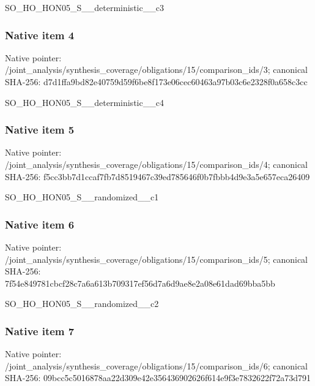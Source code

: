 \documentclass[10pt,a4paper]{article}
\begin{document}
\begingroup\raggedright\sloppy SO\_\allowbreak{}HO\_\allowbreak{}HON05\_\allowbreak{}S\_\allowbreak{}\_\allowbreak{}deterministic\_\allowbreak{}\_\allowbreak{}c3\par\endgroup

\subsubsection{Native item 4}
Native pointer: /joint\_\allowbreak{}analysis/synthesis\_\allowbreak{}coverage/obligations/15/comparison\_\allowbreak{}ids/3; canonical SHA-256: d7d1ffa9bd82e40759d59f6be8f173e06cec60463a97b03c6e2328f0a658c3cc

\begingroup\raggedright\sloppy SO\_\allowbreak{}HO\_\allowbreak{}HON05\_\allowbreak{}S\_\allowbreak{}\_\allowbreak{}deterministic\_\allowbreak{}\_\allowbreak{}c4\par\endgroup

\subsubsection{Native item 5}
Native pointer: /joint\_\allowbreak{}analysis/synthesis\_\allowbreak{}coverage/obligations/15/comparison\_\allowbreak{}ids/4; canonical SHA-256: f5cc3bb7d1ccaf7fb7d8519467c39ed785646f0b7fbbb4d9e3a5e657eca26409

\begingroup\raggedright\sloppy SO\_\allowbreak{}HO\_\allowbreak{}HON05\_\allowbreak{}S\_\allowbreak{}\_\allowbreak{}randomized\_\allowbreak{}\_\allowbreak{}c1\par\endgroup

\subsubsection{Native item 6}
Native pointer: /joint\_\allowbreak{}analysis/synthesis\_\allowbreak{}coverage/obligations/15/comparison\_\allowbreak{}ids/5; canonical SHA-256: 7f54e849781cbcf28c7a6a613b709317ef56d7a6d9ae8e2a08e61dad69bba5bb

\begingroup\raggedright\sloppy SO\_\allowbreak{}HO\_\allowbreak{}HON05\_\allowbreak{}S\_\allowbreak{}\_\allowbreak{}randomized\_\allowbreak{}\_\allowbreak{}c2\par\endgroup

\subsubsection{Native item 7}
Native pointer: /joint\_\allowbreak{}analysis/synthesis\_\allowbreak{}coverage/obligations/15/comparison\_\allowbreak{}ids/6; canonical SHA-256: 09bcc5c5016878aa22d309e42e356436902626f614e9f3e7832622f72a73d791
\end{document}
